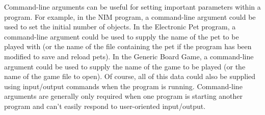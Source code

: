 Command-line arguments can be useful for setting important parameters within a program.  For example, in the NIM program, a command-line argument could be used to set the initial number of objects.  In the Electronic Pet program, a command-line argument could be used to supply the name of the pet to be played with (or the name of the file containing the pet if the program has been modified to save and reload pets).  In the Generic Board Game, a command-line argument could be used to supply the name of the game to be played (or the name of the game file to open).  Of course, all of this data could also be supplied using input/output commands when the program is running.  Command-line arguments are generally only required when one program is starting another program and can't easily respond to user-oriented input/output.

\addtocounter{chapter}{1}